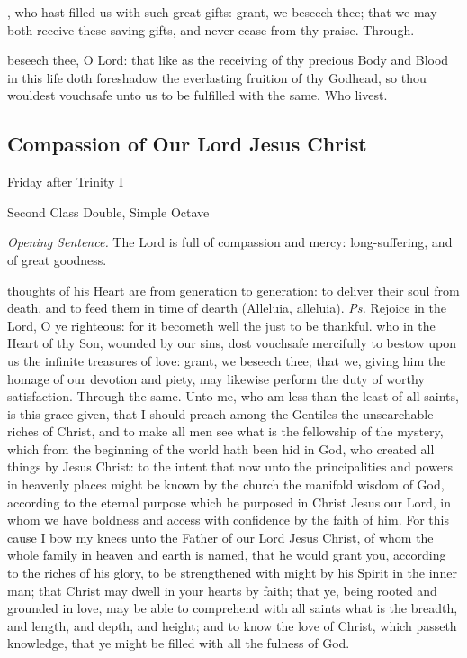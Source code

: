 \postcommunion
{}, who hast filled us with such great gifts: grant, we beseech thee; that we may both receive these saving gifts, and never cease from thy praise. Through.

 beseech thee, O Lord: that like as the receiving of thy precious Body and Blood in this life doth foreshadow the everlasting fruition of thy Godhead, so thou wouldest vouchsafe unto us to be fulfilled with the same. Who livest.


\subsection{Compassion of Our Lord Jesus Christ}
\begin{inhead}
	{Friday after Trinity I}\par
    {Second Class Double, Simple Octave}
\end{inhead}
\par\noindent
\textit{Opening Sentence.} The Lord is full of compassion and mercy: long-suffering, and of great goodness.

\introit
{} thoughts of his Heart are from generation to generation: to deliver their soul from death, and to feed them in time of dearth (Alleluia, alleluia). \textit{Ps.} Rejoice in the Lord, O ye righteous: for it becometh well the just to be thankful.
\collect
{} who in the Heart of thy Son, wounded by our sins, dost vouchsafe mercifully to bestow upon us the infinite treasures of love: grant, we beseech thee; that we, giving him the homage of our devotion and piety, may likewise perform the duty of worthy satisfaction. Through the same.
 Unto me, who am less than the least of all saints, is this grace given, that I should preach among the Gentiles the unsearchable riches of Christ, and to make all men see what is the fellowship of the mystery, which from the beginning of the world hath been hid in God, who created all things by Jesus Christ: to the intent that now unto the principalities and powers in heavenly places might be known by the church the manifold wisdom of God, according to the eternal purpose which he purposed in Christ Jesus our Lord, in whom we have boldness and access with confidence by the faith of him. For this cause I bow my knees unto the Father of our Lord Jesus Christ, of whom the whole family in heaven and earth is named, that he would grant you, according to the riches of his glory, to be strengthened with might by his Spirit in the inner man; that Christ may dwell in your hearts by faith; that ye, being rooted and grounded in love, may be able to comprehend with all saints what is the breadth, and length, and depth, and height; and to know the love of Christ, which passeth knowledge, that ye might be filled with all the fulness of God.

